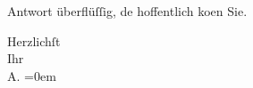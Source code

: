 \pstart
           Antwort überflüſſig, de{\geminationn} hoffentlich ko{\geminationm}en Sie.\pend
           
\pstart
           Herzlichſt{\\[\baselineskip]} Ihr{\\[\baselineskip]}\spacefill\mbox{A.}\pend
           \leftskip=0em{}\endnumbering{}
\begin{anhang}
\end{anhang}\newcommand{\dateiname}{L04198}\newcommand{\titel}{Arthur Schnitzler an Gustav Schwarzkopf, [6. 4. 1903?]}\newcommand{\editorInnen}{Herausgegeben von Jahnke, SelmaMüller, Martin Anton}
